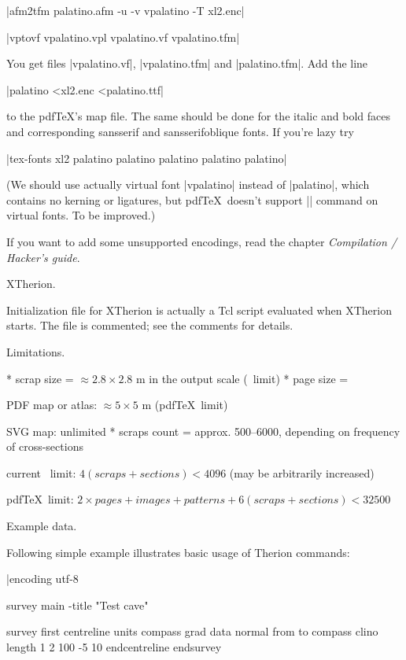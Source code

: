   |afm2tfm palatino.afm -u -v vpalatino -T xl2.enc|

  |vptovf vpalatino.vpl vpalatino.vf vpalatino.tfm|
  
  You get files |vpalatino.vf|, |vpalatino.tfm| and |palatino.tfm|. Add the line 
  
  |palatino <xl2.enc <palatino.ttf|
  
  to the pdf\TeX's map file. The same should be done for the italic and bold
  faces and corresponding sansserif and sansserifoblique fonts. If you're lazy
  try 
  
  |tex-fonts xl2 palatino palatino palatino palatino palatino|
  
  (We should use actually virtual font |vpalatino| instead of |palatino|,
  which contains no kerning or ligatures, but
  pdf\TeX\ doesn't support |\pdfincludechars| command on virtual fonts.
  To be improved.)
    
  If you want to add some unsupported encodings, 
  read the chapter {\it Compilation / Hacker's guide}. 
\endlist


\subsubchapter XTherion.

Initialization file for XTherion is actually a Tcl script evaluated when 
XTherion starts. The file is commented; see the comments for details.


%

\subchapter Limitations.

\list
*  scrap size = $\approx 2.8 \times 2.8$ m in the output scale (\MP\ limit)
*  page size = 

   PDF map or atlas: $\approx 5 \times 5$ m (pdf\TeX\ limit)
   
   SVG map: unlimited 
*  scraps count = approx. 500--6000, depending on frequency of cross-sections
   
   current \MP\ limit: $4 (scraps + sections) < 4096$ (may be arbitrarily increased)

   pdf\TeX\ limit: $2\times pages + images + patterns +
                            6 (scraps + sections) < 32500$
\endlist


\subchapter Example data.

Following simple example illustrates basic usage of Therion commands:

|encoding  utf-8

survey main -title "Test cave"
  
  survey first
    centreline
      units compass grad
      data normal from to compass clino length
                  1    2  100     -5    10
    endcentreline
  endsurvey

